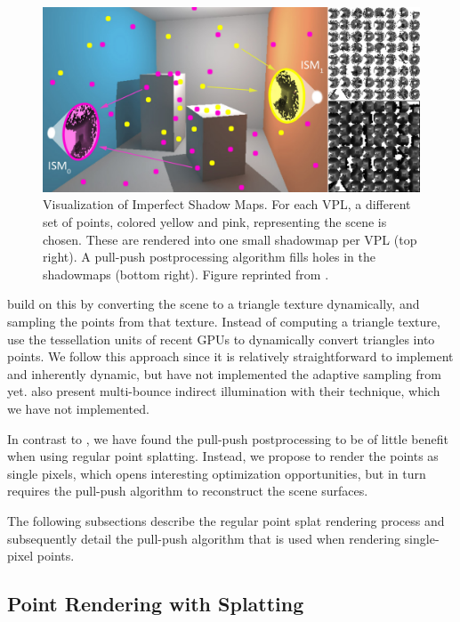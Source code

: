 \begin{figure}[htb]
\centering
    \includegraphics[width=\textwidth]{graphics/ism_ritschel_08}
  \caption{Visualization of Imperfect Shadow Maps. For each VPL, a different set of points, colored yellow and pink, representing the scene is chosen. These are rendered into one small shadowmap per VPL (top right). A pull-push postprocessing algorithm fills holes in the shadowmaps (bottom right). Figure reprinted from \citet{ritschel2008ism}.}
  \label{fig:concept:ism_ritschel_08}
\end{figure}

\citet{ritschel2011ismsViewAdaptive} build on this by converting the scene to a triangle texture dynamically, and sampling the points from that texture. Instead of computing a triangle texture, \citet{barak2013temporally} use the tessellation units of recent GPUs to dynamically convert triangles into points.
We follow this approach since it is relatively straightforward to implement and inherently dynamic, but have not implemented the adaptive sampling from \citet{ritschel2011ismsViewAdaptive} yet.
\citet{ritschel2008ism} also present multi-bounce indirect illumination with their technique, which we have not implemented.

In contrast to \citet{ritschel2008ism}, we have found the pull-push postprocessing to be of little benefit when using regular point splatting. Instead, we propose to render the points as single pixels, which opens interesting optimization opportunities, but in turn requires the pull-push algorithm to reconstruct the scene surfaces.

The following subsections describe the regular point splat rendering process and subsequently detail the pull-push algorithm that is used when rendering single-pixel points.


\subsection{Point Rendering with Splatting}

